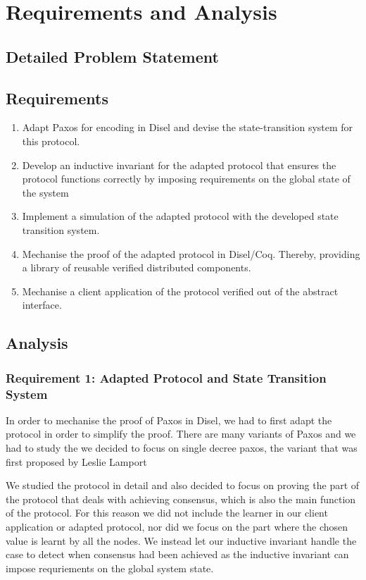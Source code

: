 \chapter{Requirements and Analysis}

\section{Detailed Problem Statement}

\section{Requirements}
\begin{enumerate}
  \item Adapt Paxos for encoding in Disel and devise the state-transition system for this protocol.
  \item Develop an inductive invariant for the adapted protocol that
    ensures the protocol functions correctly by imposing requirements on the global state of the system
  \item Implement a simulation of the adapted protocol with the developed state transition system.
  \item Mechanise the proof of the adapted protocol in Disel/Coq.
    Thereby, providing a library of reusable verified distributed components.
  \item Mechanise a client application of the protocol verified out of the abstract interface.
\end{enumerate}

\section{Analysis}
\subsection{Requirement 1: Adapted Protocol and State Transition System}
In order to mechanise the proof of Paxos in Disel, we had to first adapt the
protocol in order to simplify the proof. There are many variants of Paxos and
we had to study the we decided to focus on single decree paxos, the variant that
was first proposed by Leslie Lamport %

We studied the protocol in detail and also decided to focus on proving the
part of the protocol that deals with achieving consensus, which is also the
main function of the protocol. For this reason we did not include the learner
in our client application or adapted protocol, nor did we focus on the part
where the chosen value is learnt by all the nodes. We instead let our inductive
invariant handle the case to detect when consensus had been achieved as the
inductive invariant can impose requriements on the global system state.

